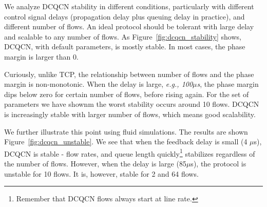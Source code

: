 We analyze DCQCN stability in different conditions, particularly with different
control signal delays (propagation delay plus queuing delay in practice), and
different number of flows. An ideal protocol should be tolerant with large delay
and scalable to any number of flows. As Figure~\ref{fig:dcqcn_stability} shows,
DCQCN, with default parameters, is mostly stable. In most cases, the phase
margin is larger than 0.

Curiously, unlike TCP, the relationship between number of flows and the phase
margin is non-monotonic.  When the delay is large, {\em e.g., 100$\mu$s}, the
phase margin dips below zero for certain number of flows, before rising again.
For the set of parameters we have shownm the worst stability occurs around 10
flows.  DCQCN is increasingly stable with larger number of flows, which means
good scalability. 

We further illustrate this point using fluid simulations. The results are shown
Figure~\ref{fig:dcqcn_unstable}. We see that when the feedback delay is small (4
$\mu$s), DCQCN is stable - flow rates, and queue length
quickly\footnote{Remember that DCQCN flows always start at line rate.}
stabilizes regardless of the number of flows. However, when the delay is large
(85$\mu$s), the protocol is unstable for 10 flows. It is, however, stable for 2
and 64 flows.

